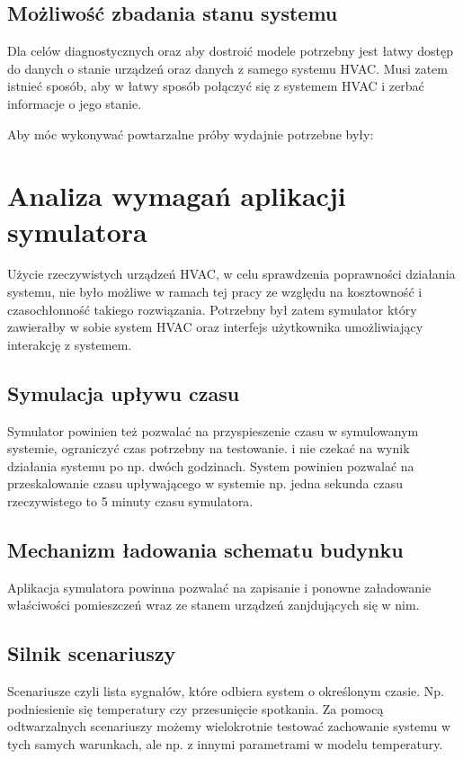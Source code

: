 \subsection*{Możliwość zbadania stanu systemu}
Dla celów diagnostycznych oraz aby dostroić modele potrzebny jest łatwy dostęp do danych o stanie urządzeń oraz danych z samego systemu HVAC. Musi zatem istnieć sposób, aby w łatwy sposób połączyć się z systemem HVAC i zerbać informacje o jego stanie.

Aby móc wykonywać powtarzalne próby wydajnie potrzebne były:

\section{Analiza wymagań aplikacji symulatora}
Użycie rzeczywistych urządzeń HVAC, w celu sprawdzenia poprawności działania systemu, nie było możliwe w ramach tej pracy ze względu na kosztowność i czasochłonność takiego rozwiązania. 
Potrzebny był zatem symulator który zawierałby w sobie system HVAC oraz interfejs użytkownika umożliwiający interakcję z systemem. 

\subsection*{Symulacja upływu czasu}
Symulator powinien też pozwalać na przyspieszenie czasu w symulowanym systemie, ograniczyć czas potrzebny na testowanie.
i nie czekać na wynik działania systemu po np. dwóch godzinach. System powinien pozwalać na przeskalowanie czasu upływającego w systemie np. jedna sekunda czasu rzeczywistego to 5 minuty czasu symulatora.

\subsection*{Mechanizm ładowania schematu budynku}
Aplikacja symulatora powinna pozwalać na zapisanie i ponowne załadowanie właściwości pomieszczeń wraz ze stanem urządzeń zanjdujących się w nim.

\subsection*{Silnik scenariuszy}
Scenariusze czyli lista sygnałów, które odbiera system o określonym czasie. Np. podniesienie się temperatury czy przesunięcie spotkania. Za pomocą odtwarzalnych scenariuszy możemy wielokrotnie testować zachowanie systemu w tych samych warunkach, ale np. z innymi parametrami w modelu temperatury.
